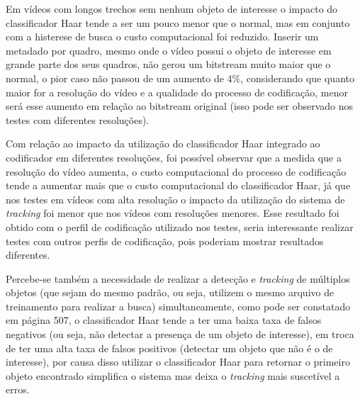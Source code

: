 Em vídeos com longos trechos sem nenhum objeto de interesse o impacto do classificador Haar tende a ser um pouco menor que o normal, mas em conjunto com a histerese de busca o custo computacional foi reduzido. Inserir um metadado por quadro, mesmo onde o vídeo possui o objeto de interesse em grande parte dos seus quadros, não gerou um bitstream muito maior que o normal, o pior caso não passou de um aumento de 4\%, considerando que quanto maior for a resolução do vídeo e a qualidade do processo de codificação, menor será esse aumento em relação ao bitstream original (isso pode ser observado nos testes com diferentes resoluções).

Com relação ao impacto da utilização do classificador Haar integrado ao codificador em diferentes resoluções, foi possível observar que a medida que a resolução do vídeo aumenta, o custo computacional do processo de codificação tende a aumentar mais que o custo computacional do classificador Haar, já que nos testes em vídeos com alta resolução o impacto da utilização do sistema de \textit{tracking} foi menor que nos vídeos com resoluções menores. Esse resultado foi obtido com o perfil de codificação utilizado nos testes, seria interessante realizar testes com outros perfis de codificação, pois poderiam mostrar resultados diferentes.

Percebe-se também a necessidade de realizar a detecção e \textit{tracking} de múltiplos objetos (que sejam do mesmo padrão, ou seja, utilizem o mesmo arquivo de treinamento para realizar a busca) simultaneamente, como pode ser constatado em \cite{learningOpenCV} página 507, o classificador Haar tende a ter uma baixa taxa de falsos negativos (ou seja, não detectar a presença de um objeto de interesse), em troca de ter uma alta taxa de falsos positivos (detectar um objeto que não é o de interesse), por causa disso utilizar o classificador Haar para retornar o primeiro objeto encontrado simplifica o sistema mas deixa o \textit{tracking} mais suscetível a erros.
  

